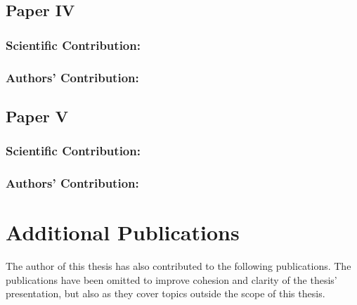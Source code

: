 \subsection*{Paper IV}%
%
\begin{quote}
\end{quote}

\subsubsection*{Scientific Contribution:}%
%
\subsubsection*{Authors' Contribution:}%
%


\clearpage %

\subsection*{Paper V}%
%
\begin{quote}
\end{quote}

\subsubsection*{Scientific Contribution:}%
%
\subsubsection*{Authors' Contribution:}%
%


\clearpage %

\section{Additional Publications}%
\label{sec:additional-publications}%
%
The author of this thesis has also contributed to the following publications.
The publications have been omitted to improve cohesion and clarity of the thesis' presentation, but also as they cover topics outside the scope of this thesis.

\begin{quote}
\end{quote}

\begin{quote}
\end{quote}

\begin{quote}
\end{quote}

\begin{quote}
\end{quote}

\begin{quote}
\end{quote}
